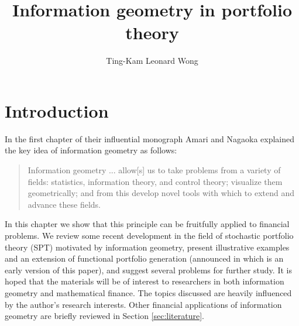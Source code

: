 \documentclass[graybox]{svmult}
\begin{document}
\title*{Information geometry in portfolio theory}
\author{Ting-Kam Leonard Wong}
%
%
\maketitle



\section{Introduction}
In the first chapter of their influential monograph \cite[p.1]{AN02} Amari and Nagaoka explained the key idea of information geometry as follows:
\begin{quote}
Information geometry ... allow[s] us to take problems from a variety of fields: statistics, information theory, and control theory; visualize them geometrically; and from this develop novel tools with which to extend and advance these fields.
\end{quote}
In this chapter we show that this principle can be fruitfully applied to financial problems. We review some recent development in the field of stochastic portfolio theory (SPT) motivated by information geometry, present illustrative examples and an extension of functional portfolio generation (announced in \cite{W17a} which is an early version of this paper), and suggest several problems for further study. It is hoped that the materials will be of interest to researchers in both information geometry and mathematical finance. The topics discussed are heavily influenced by the author's research interests. Other financial applications of information geometry are briefly reviewed in Section \ref{sec:literature}.
\end{document}
